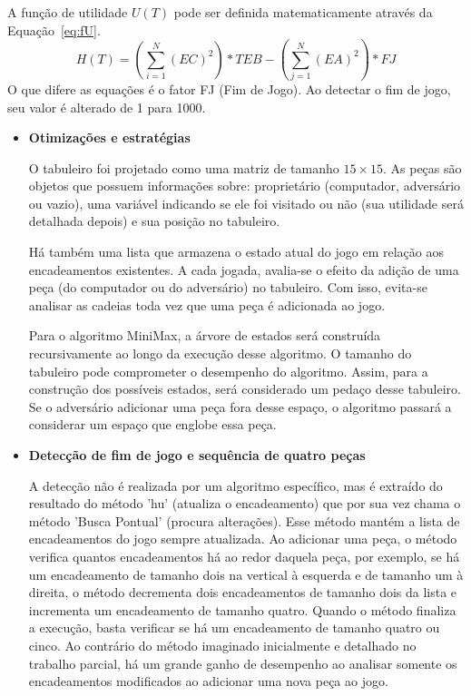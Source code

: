 \documentclass[a4paper,12pt]{article}
\begin{document}
\begin{itemize}
 A função de utilidade $U(T)$ pode ser definida matematicamente através da Equação~\ref{eq:fU}. 
  \begin{equation}\label{eq:fU}
   H(T) = \left(\sum_{i=1}^{N} (EC)^2\right)*TEB - \left(\sum_{j=1}^{N} (EA)^2\right) * FJ
 \end{equation}
 O que difere as equações é o fator FJ (Fim de Jogo). Ao detectar o fim de jogo, seu valor é alterado de 1 para 1000.
\end{itemize}

\begin{itemize}
 \item \textbf{Otimizações e estratégias}
 
 O tabuleiro foi projetado como uma matriz de tamanho $15 \times 15$. As peças são objetos que possuem 
 informações sobre: proprietário (computador, adversário ou vazio), uma variável indicando se ele foi visitado ou não (sua utilidade será detalhada depois)
 e sua posição no tabuleiro.
 
 Há também uma lista que armazena o estado atual do jogo em relação aos encadeamentos existentes. A cada jogada, avalia-se
 o efeito da adição de uma peça (do computador ou do adversário) no tabuleiro. Com isso, evita-se analisar as cadeias toda vez que uma peça é adicionada ao jogo.
 
 Para o algoritmo MiniMax, a árvore de estados será construída recursivamente ao longo da execução desse algoritmo. O tamanho do tabuleiro
 pode comprometer o desempenho do algoritmo. Assim, para a construção dos possíveis estados, será considerado
 um pedaço desse tabuleiro. Se o adversário adicionar uma peça fora desse espaço, o algoritmo passará
 a considerar um espaço que englobe essa peça.
 
\end{itemize}

\begin{itemize}
 \item \textbf{Detecção de fim de jogo e sequência de quatro peças}
 
 A detecção não é realizada por um algoritmo específico, mas é extraído do resultado do método 'hu' (atualiza o encadeamento) que por sua vez chama o método 'Busca Pontual' (procura alterações).
 Esse método mantém a lista de encadeamentos do jogo sempre atualizada. Ao adicionar uma peça, o método verifica quantos encadeamentos 
 há ao redor daquela peça, por exemplo, se há um encadeamento de tamanho dois na vertical à esquerda e de tamanho um à direita, o método decrementa
 dois encadeamentos de tamanho dois da lista e incrementa um encadeamento de tamanho quatro. Quando o método finaliza a execução, 
 basta verificar se há um encadeamento de tamanho quatro ou cinco. Ao contrário do método imaginado inicialmente e detalhado
 no trabalho parcial, há um grande ganho de desempenho ao analisar somente os encadeamentos modificados ao adicionar uma nova peça ao jogo.

\end{itemize}
\end{document}
